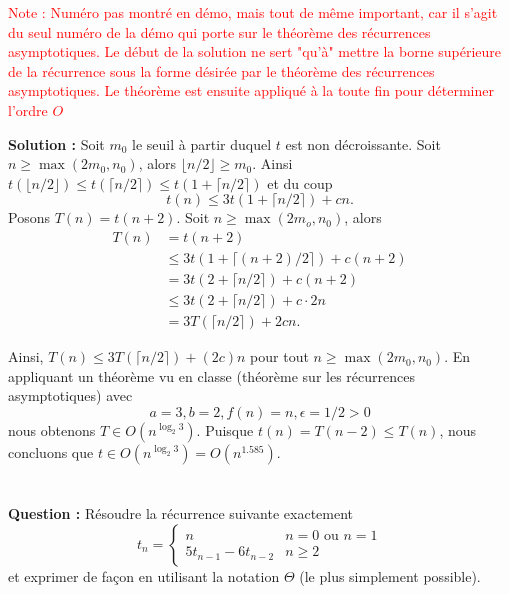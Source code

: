\documentclass[11pt]{article} %
\newenvironment{question}[1][\unskip]{%
	\par
	\noindent
	\textbf{Question #1:}
	\noindent}
{\medskip}
\newenvironment{solution}[1][\unskip]{%
	\par
	\noindent
	\textbf{Solution #1:}
	\noindent}
{\medskip}
\begin{document}
\textcolor{red}{Note : Numéro pas montré en démo, mais tout de même important, car il s'agit du seul numéro de la démo qui porte sur le théorème des récurrences asymptotiques. Le début de la solution ne sert "qu'à" mettre la borne supérieure de la récurrence sous la forme désirée par le théorème des récurrences asymptotiques. Le théorème est ensuite appliqué à la toute fin pour déterminer l'ordre $O$}
	\begin{solution}
		Soit $m_0$ le seuil à partir duquel $t$ est non décroissante. Soit $n\geq \max(2m_0,n_0)$, alors $\lfloor n/2 \rfloor \geq m_0$. Ainsi $t(\lfloor n/2\rfloor) \leq t(\lceil n/2\rceil) \leq t(1 + \lceil n/2\rceil) $ et du coup
		\begin{equation}
			t(n)\leq 3t(1+ \lceil n/2 \rceil)+cn.
		\end{equation}
		Posons $T(n)=t(n+2)$. Soit $n\geq \max(2m_o,n_0)$, alors
		\begin{align*}
			T(n)&=t(n+2)\\
			&\leq 3t(1+\lceil (n+2)/2\rceil) + c(n+2) \\
			&=3t(2+\lceil n/2 \rceil)+c(n+2)\\
			&\leq 3t(2+\lceil n/2 \rceil)+c\cdot 2n\\
			&= 3T(\lceil n/2 \rceil)+2cn.
		\end{align*}
		
		Ainsi, $T(n)\leq 3T(\lceil n/2 \rceil) +(2c)n$ pour tout $n \geq \max(2m_0,n_0)$. En appliquant un théorème vu en classe (théorème sur les récurrences asymptotiques) avec 
		$$a=3, b=2, f(n)=n, \epsilon=1/2>0$$
		nous obtenons $T \in O(n^{\log_2 3})$. Puisque $t(n)=T(n-2)\leq T(n)$, nous concluons que $t \in O(n^{\log_2 3})=O(n^{1.585})$.
	\end{solution}

	
\section{}
\begin{question}
	Résoudre la récurrence suivante exactement
	\begin{equation}
	\label{tn}
	t_n=\begin{cases}
	n & \text{$n=0$ ou $n=1$}\\
	5t_{n-1}-6t_{n-2}&n\geq 2
	\end{cases}
	\end{equation}
	et exprimer de façon en utilisant la notation $\Theta$ (le plus simplement possible).	
\end{question}
\end{document}
